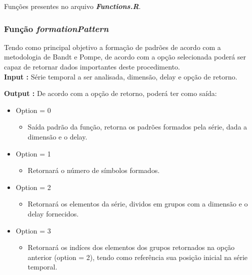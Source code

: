 \documentclass[12pt,letterpaper]{article}
\begin{document}
Funções presentes no arquivo \textbf{\textit{Functions.R}}.

\subsubsection{Função \textit{formationPattern}}

Tendo como principal objetivo a formação de padrões de acordo com a metodologia de Bandt e Pompe, de acordo com a opção selecionada poderá ser capaz de retornar dados importantes deste procedimento.\\

\textbf{Input :} Série temporal a ser analisada, dimensão, delay e opção de retorno.

\textbf{Output :} De  acordo com a opção de retorno, poderá ter como saída:
\begin{itemize}
\item Option = 0 
	\begin{itemize}
	\item Saída padrão da função, retorna os padrões formados pela série, dada a dimensão e o delay.
	\end{itemize}
\item Option = 1 
	\begin{itemize}
	\item Retornará o número de símbolos formados.
	\end{itemize}
\item Option = 2 
	\begin{itemize}
	\item Retornará os elementos da série, dividos em grupos com a dimensão e o delay fornecidos.
	\end{itemize}
\item Option = 3 
	\begin{itemize}
	\item Retornará os indíces dos elementos dos grupos retornados na opção anterior (option = 2), tendo como referência sua posição inicial na série temporal.
	\end{itemize}
\end{itemize}
\end{document}
